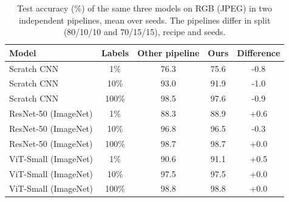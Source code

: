 \begin{table}[t]
\centering
\caption{Test accuracy (\%) of the same three models on RGB (JPEG) in two independent pipelines, mean over seeds. The pipelines differ in split (80/10/10 and 70/15/15), recipe and seeds.}
\label{tab:crosscheck}
\small
\begin{tabular}{lcccc}
\toprule
Model & Labels & Other pipeline & Ours & Difference \\
\midrule
Scratch CNN & 1\% & 76.3 & 75.6 & -0.8 \\
Scratch CNN & 10\% & 93.0 & 91.9 & -1.0 \\
Scratch CNN & 100\% & 98.5 & 97.6 & -0.9 \\
ResNet-50 (ImageNet) & 1\% & 88.3 & 88.9 & +0.6 \\
ResNet-50 (ImageNet) & 10\% & 96.8 & 96.5 & -0.3 \\
ResNet-50 (ImageNet) & 100\% & 98.7 & 98.7 & +0.0 \\
ViT-Small (ImageNet) & 1\% & 90.6 & 91.1 & +0.5 \\
ViT-Small (ImageNet) & 10\% & 97.5 & 97.5 & +0.0 \\
ViT-Small (ImageNet) & 100\% & 98.8 & 98.8 & +0.0 \\
\bottomrule
\end{tabular}
\end{table}
